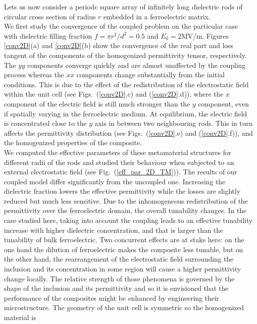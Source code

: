 \documentclass[%
 aip,
 amsmath,amssymb,
 reprint,%
]{revtex4-1}
\newcommand{\fig}[1]{Fig.~(\ref{#1})}
\begin{document}
Lets us now consider a periodc square array of infinitely long dielectric rods of circular cross section
of radius $r$ embedded in a ferroelectric matrix.\\
We first study the convergence of the coupled problem on the particular case with dielectric
filling fraction $f=\pi r^2/d^2=0.5$ and $E_0=2$MV/m. Figures \ref{conv2D}(a) and \ref{conv2D}(b) show the
convergence of the real part and loss tangent of the components of the homogenized
permittivity tensor, respectively. The $yy$ components converge quickly
and are almost unaffected by the coupling process whereas the
$xx$ components change substantially from the initial conditions.
This is due to the effect of the redistribution
of the electrostatic field within the unit cell (see Figs.~(\ref{conv2D}.c) and (\ref{conv2D}.d)),
where the $x$ component of the electric field is still much stronger
than the $y$ component, even if spatially varying in the ferroelectric medium.
At equilibrium, the electric field is concentrated close to the $y$ axis in between two neighbouring
rods. This in turn affects the permittivity distribution (see Figs.~(\ref{conv2D}.e) and (\ref{conv2D}.f)),
and the homogenized properties of the composite.\\
We computed the effective parameters of these metamaterial structures for different
radii of the rods and studied their behaviour when subjected to an external
electrostatic field (see \fig{eff_par_2D_TM}). The results of our coupled
model differ significantly from the uncoupled one. Increasing the dielectric fraction
lowers the effective permittivity while the losses are slightly reduced but much less sensitive.
Due to the inhomogeneous redistribution of the permittivity over the ferroelectric domain, the
overall tunability changes. In the case studied here, taking into account
the coupling leads to an effective tunability increase with
higher dielectric concentration, and that is larger than the tunability
 of bulk ferroelectric. Two concurrent effects are at stake here: on the one hand
the dilution of ferroelectric makes the composite less tunable, but on the other hand,
the rearrangement of the electrostatic field surrounding the inclusion and its
concentration in some region will cause a higher permittivity change locally.
The relative strength of those phenomena is governed by the shape of the inclusion and its permittivity
and so it is envisioned that the performance of the composites might be enhanced by engineering
their microstructure.
The geometry of the unit cell is symmetric so the homogenized material is
\end{document}
